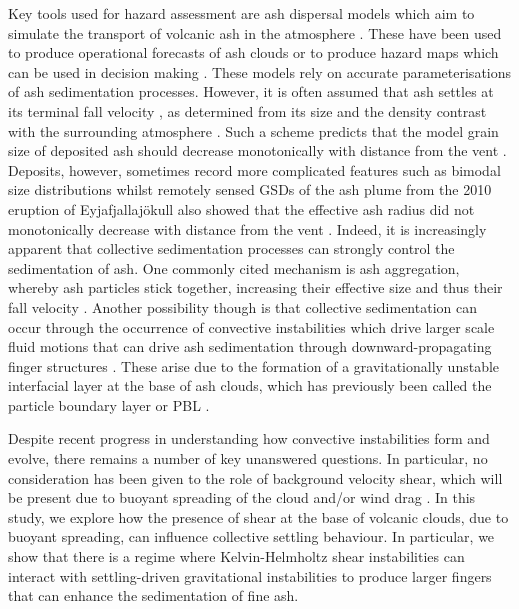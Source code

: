 \documentclass[authoryear,preprint,review,12pt]{elsarticle}
\begin{document}
Key tools used for hazard assessment are ash dispersal models which aim to simulate the transport of volcanic ash in the atmosphere \citep{Witham07, Bonadonna12, Folch12}. These have been used to produce operational forecasts of ash clouds \citep{Scollo09, Webster12} or to produce hazard maps which can be used in decision making \citep{Bonadonna05, Macedonio05, Folch10}. These models rely on accurate parameterisations of ash sedimentation processes. However, it is often assumed that ash settles at its terminal fall velocity \citep{Hazen04}, as determined from its size and the density contrast with the surrounding atmosphere \citep{Clift71, Ganser93}. Such a scheme predicts that the model grain size of deposited ash should decrease monotonically with distance from the vent \citep{Bursik92a, Sparks92}. Deposits, however, sometimes record more complicated features such as bimodal size distributions whilst remotely sensed GSDs of the ash plume from the 2010 eruption of Eyjafjallaj{\"o}kull also showed that the effective ash radius did not monotonically decrease with distance from the vent \citep{Bonadonna11}. Indeed, it is increasingly apparent that collective sedimentation processes can strongly control the sedimentation of ash. One commonly cited mechanism is ash aggregation, whereby ash particles stick together, increasing their effective size and thus their fall velocity \citep{Carey82, Sorem82, Lane93, Bonadonna11, Brown12}. Another possibility though is that collective sedimentation can occur through the occurrence of convective instabilities which drive larger scale fluid motions that can drive ash sedimentation through downward-propagating finger structures \citep{Bonadonna02, Bonadonna11, Carrazo12, Manzella15, Scollo17, Fries21}. These arise due to the formation of a gravitationally unstable interfacial layer at the base of ash clouds, which has previously been called the particle boundary layer or PBL \citep{Carrazo12}.

Despite recent progress in understanding how convective instabilities form and evolve, there remains a number of key unanswered questions. In particular, no consideration has been given to the role of background velocity shear, which will be present due to buoyant spreading of the cloud and/or wind drag \citep{Johnson15}. In this study, we explore how the presence of shear at the base of volcanic clouds, due to buoyant spreading, can influence collective settling behaviour. In particular, we show that there is a regime where Kelvin-Helmholtz shear instabilities \citep{Helmholtz68, Kelvin71, Jarvis21} can interact with settling-driven gravitational instabilities \citep{Hoyal99, Blanchette05} to produce larger fingers that can enhance the sedimentation of fine ash.
\end{document}
